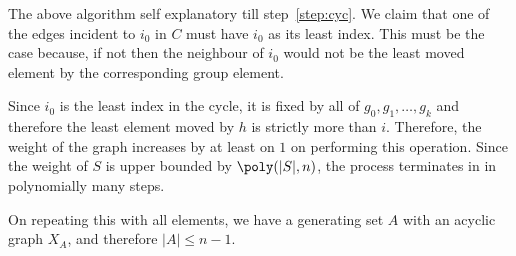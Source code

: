 The above algorithm self explanatory till step~\ref{step:cyc}. We claim that
one of the edges incident to $i_0$ in $C$ must have $i_0$ as its least index.
This must be the case because, if not then the
neighbour of $i_0$ would not be the least moved element by the corresponding
group element.

Since $i_0$ is the least index in the cycle, it is fixed by all of 
$g_0, g_1,\ldots, g_k$ and therefore the least element moved by $h$ is
strictly more than $i$. Therefore, the weight of the graph increases by at
least on $1$ on performing this operation. 
Since the weight of $S$ is upper bounded by $\poly(|S|,n)$, the process 
terminates in in polynomially many steps. 
	
On repeating this with all elements, we have a generating set $A$ with an
acyclic graph $X_{A}$, and therefore $|A|\leq n-1$.


